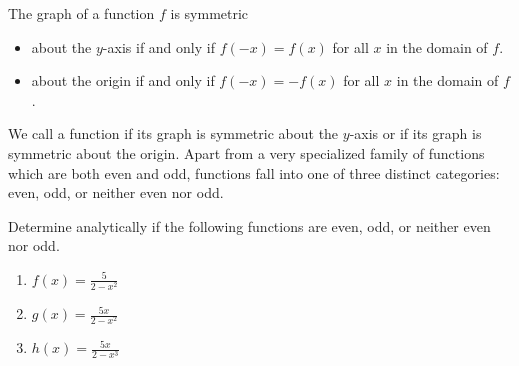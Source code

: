 \documentclass[nooutcomes]{ximera}
\begin{document}
The graph of a function $f$ is symmetric 

\begin{itemize}

\item  about the $y$-axis if and only if $f(-x) = f(x)$ for all $x$ in the domain of $f$.

\item  about the origin if and only if $f(-x) = -f(x)$ for all $x$ in the domain of $f$.

\end{itemize}

\begin{definition}
We call a function  if its graph is symmetric about the $y$-axis or  if its graph is symmetric about the origin.  Apart from a very specialized family of functions which are both even and odd, functions fall into one of three distinct categories: even, odd, or neither even nor odd.  
\end{definition}

\begin{example}
Determine analytically if the following functions are even, odd, or neither even nor odd. 
\begin{enumerate}
\item $f(x) = \frac{5}{2 - x^2}$ 
\item $g(x) = \frac{5x}{2 - x^2}$ 
\item $h(x) = \frac{5x}{2 - x^3}$
\end{enumerate}
\end{example}
\end{document}
